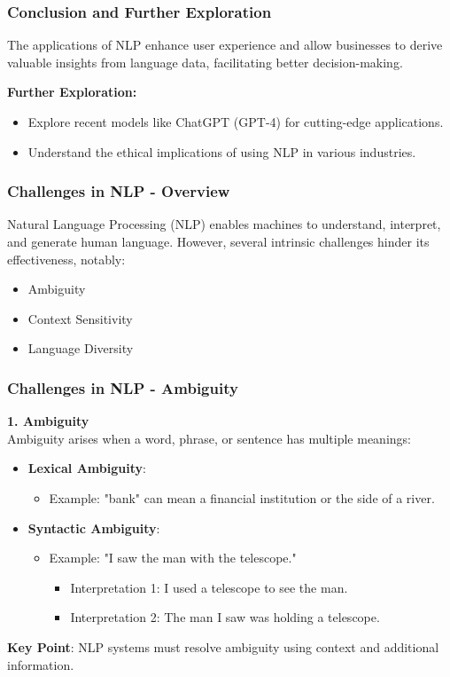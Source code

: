\documentclass[aspectratio=169]{beamer}
\begin{document}
\begin{frame}[fragile]
    \frametitle{Conclusion and Further Exploration}
    The applications of NLP enhance user experience and allow businesses to derive valuable insights from language data, facilitating better decision-making. 

    \textbf{Further Exploration:}
    \begin{itemize}
        \item Explore recent models like ChatGPT (GPT-4) for cutting-edge applications.
        \item Understand the ethical implications of using NLP in various industries.
    \end{itemize}
\end{frame}

\begin{frame}[fragile]
    \frametitle{Challenges in NLP - Overview}
    
    Natural Language Processing (NLP) enables machines to understand, interpret, and generate human language. 
    However, several intrinsic challenges hinder its effectiveness, notably:
    \begin{itemize}
        \item Ambiguity
        \item Context Sensitivity
        \item Language Diversity
    \end{itemize}
\end{frame}

\begin{frame}[fragile]
    \frametitle{Challenges in NLP - Ambiguity}
    
    \textbf{1. Ambiguity} \\
    Ambiguity arises when a word, phrase, or sentence has multiple meanings:
    \begin{itemize}
        \item \textbf{Lexical Ambiguity}:
        \begin{itemize}
            \item Example: "bank" can mean a financial institution or the side of a river.
        \end{itemize}
        
        \item \textbf{Syntactic Ambiguity}: 
        \begin{itemize}
            \item Example: "I saw the man with the telescope."
            \begin{itemize}
                \item Interpretation 1: I used a telescope to see the man.
                \item Interpretation 2: The man I saw was holding a telescope.
            \end{itemize}
        \end{itemize}
    \end{itemize}
    
    \textbf{Key Point}: NLP systems must resolve ambiguity using context and additional information.
\end{frame}
\end{document}
